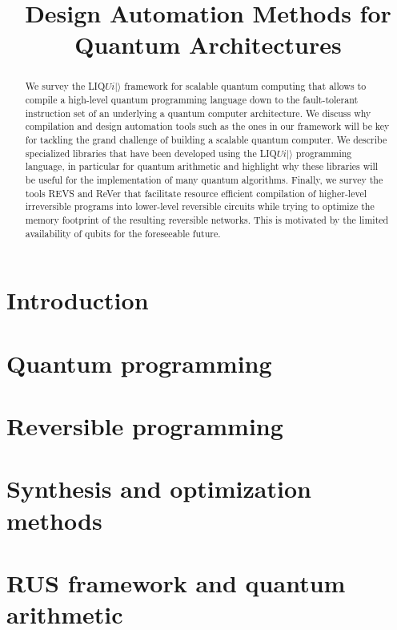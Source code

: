 \documentclass[conference]{IEEEtran}
\title{Design Automation Methods for Quantum Architectures}
\author{%
  \IEEEauthorblockN{Martin Roetteler \qquad Krysta M. Svore \qquad Nathan Wiebe}
  \IEEEauthorblockA{%
Microsoft Research, Redmond, WA, USA
  }
}
\begin{document}
\maketitle

\begin{abstract}
We survey the LIQ$Ui|\rangle$ framework for scalable quantum computing that allows to compile a high-level quantum programming language down to the fault-tolerant instruction set of an underlying a quantum computer architecture. We discuss why compilation and design automation tools such as the ones in our framework will be key for tackling the grand challenge of building a scalable quantum computer. We describe specialized libraries that have been developed using the LIQ$Ui|\rangle$ programming language, in particular for quantum arithmetic and highlight why these libraries will be useful for the implementation of many quantum algorithms. Finally, we survey the tools REVS and ReVer that facilitate resource efficient compilation of higher-level irreversible programs into lower-level reversible circuits while trying to optimize the memory footprint of the resulting reversible networks. This is motivated by the limited availability of qubits for the foreseeable future. 
\end{abstract}

\section{Introduction}
\cite{PRS15}
\section{Quantum programming} %

\section{Reversible programming} %

\section{Synthesis and optimization methods}%

\section{RUS framework and quantum arithmetic} %
\end{document}
